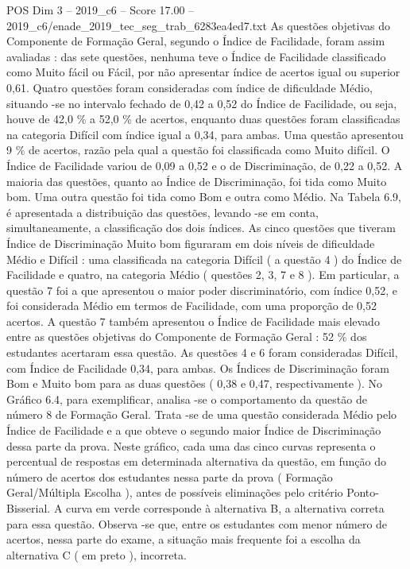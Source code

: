\begin{textsample}{POS Dim 3 – 2019\_c6 – Score 17.00 – 2019\_c6/enade\_2019\_tec\_seg\_trab\_6283ea4ed7.txt}
As questões objetivas do Componente de Formação Geral, segundo o Índice de Facilidade, foram assim avaliadas : das sete questões, nenhuma teve o Índice de Facilidade classificado como Muito fácil ou Fácil, por não apresentar índice de acertos igual ou superior 0,61.
Quatro questões foram consideradas com índice de dificuldade Médio, situando -se no intervalo fechado de 0,42 a 0,52 do Índice de Facilidade, ou seja, houve de 42,0 \% a 52,0 \% de acertos, enquanto duas questões foram classificadas na categoria Difícil com índice igual a 0,34, para ambas.
Uma questão apresentou 9 \% de acertos, razão pela qual a questão foi classificada como Muito difícil.
O Índice de Facilidade variou de 0,09 a 0,52 e o de Discriminação, de 0,22 a 0,52.
A maioria das questões, quanto ao Índice de Discriminação, foi tida como Muito bom.
Uma outra questão foi tida como Bom e outra como Médio.
Na Tabela 6.9, é apresentada a distribuição das questões, levando -se em conta, simultaneamente, a classificação dos dois índices.
As cinco questões que tiveram Índice de Discriminação Muito bom figuraram em dois níveis de dificuldade Médio e Difícil : uma classificada na categoria Difícil ( a questão 4 ) do Índice de Facilidade e quatro, na categoria Médio ( questões 2, 3, 7 e 8 ).
Em particular, a questão 7 foi a que apresentou o maior poder discriminatório, com índice 0,52, e foi considerada Médio em termos de Facilidade, com uma proporção de 0,52 acertos.
A questão 7 também apresentou o Índice de Facilidade mais elevado entre as questões objetivas do Componente de Formação Geral : 52 \% dos estudantes acertaram essa questão.
As questões 4 e 6 foram consideradas Difícil, com Índice de Facilidade 0,34, para ambas.
Os Índices de Discriminação foram Bom e Muito bom para as duas questões ( 0,38 e 0,47, respectivamente ).
No Gráfico 6.4, para exemplificar, analisa -se o comportamento da questão de número 8 de Formação Geral.
Trata -se de uma questão considerada Médio pelo Índice de Facilidade e a que obteve o segundo maior Índice de Discriminação dessa parte da prova.
Neste gráfico, cada uma das cinco curvas representa o percentual de respostas em determinada alternativa da questão, em função do número de acertos dos estudantes nessa parte da prova ( Formação Geral/Múltipla Escolha ), antes de possíveis eliminações pelo critério Ponto-Bisserial.
A curva em verde corresponde à alternativa B, a alternativa correta para essa questão.
Observa -se que, entre os estudantes com menor número de acertos, nessa parte do exame, a situação mais frequente foi a escolha da alternativa C ( em preto ), incorreta.

\end{textsample}
